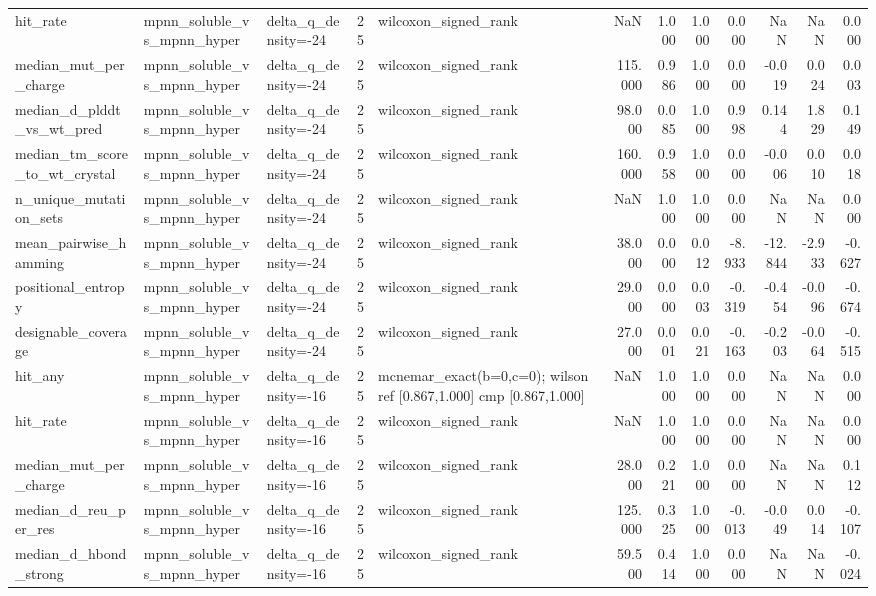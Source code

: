 \begin{table}
{\begin{tabular}{lllrlrrrrrrr}
hit\_rate & mpnn\_soluble\_vs\_mpnn\_hyper & delta\_q\_density=-24 & 25 & wilcoxon\_signed\_rank & NaN & 1.000 & 1.000 & 0.000 & NaN & NaN & 0.000 \\
median\_mut\_per\_charge & mpnn\_soluble\_vs\_mpnn\_hyper & delta\_q\_density=-24 & 25 & wilcoxon\_signed\_rank & 115.000 & 0.986 & 1.000 & 0.000 & -0.019 & 0.024 & 0.003 \\
median\_d\_plddt\_vs\_wt\_pred & mpnn\_soluble\_vs\_mpnn\_hyper & delta\_q\_density=-24 & 25 & wilcoxon\_signed\_rank & 98.000 & 0.085 & 1.000 & 0.998 & 0.144 & 1.829 & 0.149 \\
median\_tm\_score\_to\_wt\_crystal & mpnn\_soluble\_vs\_mpnn\_hyper & delta\_q\_density=-24 & 25 & wilcoxon\_signed\_rank & 160.000 & 0.958 & 1.000 & 0.000 & -0.006 & 0.010 & 0.018 \\
n\_unique\_mutation\_sets & mpnn\_soluble\_vs\_mpnn\_hyper & delta\_q\_density=-24 & 25 & wilcoxon\_signed\_rank & NaN & 1.000 & 1.000 & 0.000 & NaN & NaN & 0.000 \\
mean\_pairwise\_hamming & mpnn\_soluble\_vs\_mpnn\_hyper & delta\_q\_density=-24 & 25 & wilcoxon\_signed\_rank & 38.000 & 0.000 & 0.012 & -8.933 & -12.844 & -2.933 & -0.627 \\
positional\_entropy & mpnn\_soluble\_vs\_mpnn\_hyper & delta\_q\_density=-24 & 25 & wilcoxon\_signed\_rank & 29.000 & 0.000 & 0.003 & -0.319 & -0.454 & -0.096 & -0.674 \\
designable\_coverage & mpnn\_soluble\_vs\_mpnn\_hyper & delta\_q\_density=-24 & 25 & wilcoxon\_signed\_rank & 27.000 & 0.001 & 0.021 & -0.163 & -0.203 & -0.064 & -0.515 \\
hit\_any & mpnn\_soluble\_vs\_mpnn\_hyper & delta\_q\_density=-16 & 25 & mcnemar\_exact(b=0,c=0); wilson ref [0.867,1.000] cmp [0.867,1.000] & NaN & 1.000 & 1.000 & 0.000 & NaN & NaN & 0.000 \\
hit\_rate & mpnn\_soluble\_vs\_mpnn\_hyper & delta\_q\_density=-16 & 25 & wilcoxon\_signed\_rank & NaN & 1.000 & 1.000 & 0.000 & NaN & NaN & 0.000 \\
median\_mut\_per\_charge & mpnn\_soluble\_vs\_mpnn\_hyper & delta\_q\_density=-16 & 25 & wilcoxon\_signed\_rank & 28.000 & 0.221 & 1.000 & 0.000 & NaN & NaN & 0.112 \\
median\_d\_reu\_per\_res & mpnn\_soluble\_vs\_mpnn\_hyper & delta\_q\_density=-16 & 25 & wilcoxon\_signed\_rank & 125.000 & 0.325 & 1.000 & -0.013 & -0.049 & 0.014 & -0.107 \\
median\_d\_hbond\_strong & mpnn\_soluble\_vs\_mpnn\_hyper & delta\_q\_density=-16 & 25 & wilcoxon\_signed\_rank & 59.500 & 0.414 & 1.000 & 0.000 & NaN & NaN & -0.024 \\

\end{tabular}}
\end{table}

